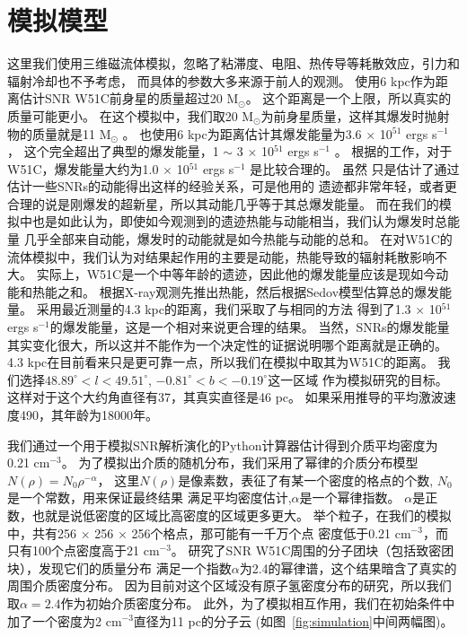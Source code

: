 \section{模拟模型}
\label{W51Cmod}
这里我们使用三维磁流体模拟，忽略了粘滞度、电阻、热传导等耗散效应，引力和辐射冷却也不予考虑，
而具体的参数大多来源于前人的观测。
\citet{Sasaki2014}使用6 kpc作为距离估计SNR W51C前身星的质量超过20 M$_\odot$。
这个距离是一个上限，所以真实的质量可能更小。
在这个模拟中，我们取20 M$_\odot$为前身星质量，这样其爆发时抛射物的质量就是11 M$_\odot$
\citep{Sukhbold2016}。
\citet{Koo1995}也使用6 kpc为距离估计其爆发能量为3.6 $\times$ 10$^{51}$ ergs s$^{-1}$，
这个完全超出了典型的爆发能量，1 $\sim$ 3 $\times$ 10$^{51}$ ergs s$^{-1}$ \citep{Poznanski2013}。
根据\citet{Poznanski2013}的工作，对于W51C，爆发能量大约为1.0 $\times$ 10$^{51}$ ergs s$^{-1}$
是比较合理的。
虽然 \citet{Poznanski2013}只是估计了通过估计一些SNRs的动能得出这样的经验关系，可是他用的
遗迹都非常年轻，或者更合理的说是刚爆发的超新星，所以其动能几乎等于其总爆发能量。
而在我们的模拟中也是如此认为，即使如今观测到的遗迹热能与动能相当，我们认为爆发时总能量
几乎全部来自动能，爆发时的动能就是如今热能与动能的总和。
在对W51C的流体模拟中，我们认为对结果起作用的主要是动能，热能导致的辐射耗散影响不大。
实际上，W51C是一个中等年龄的遗迹，因此他的爆发能量应该是现如今动能和热能之和。
\citet{Koo1995}根据X-ray观测先推出热能，然后根据Sedov模型估算总的爆发能量\citep{1959sdmm.book.....S}。
采用最近测量的4.3 kpc的距离\citep{Tian2013}，我们采取了与\citet{Koo1995}相同的方法
得到了1.3 $\times$ 10$^{51}$ ergs s$^{-1}$的爆发能量，这是一个相对来说更合理的结果。
当然，SNRs的爆发能量其实变化很大，所以这并不能作为一个决定性的证据说明哪个距离就是正确的。
4.3 kpc在目前看来只是更可靠一点，所以我们在模拟中取其为W51C的距离。
我们选择$48.89^{\circ}<l<49.51^{\circ}$, $-0.81^{\circ}<b<-0.19^{\circ}$这一区域
作为模拟研究的目标。
这样对于这个大约角直径有37，其真实直径是46 pc。
如果采用\citet{Koo1995}推导的平均激波速度490\kms，其年龄为18000年。

我们通过一个用于模拟SNR解析演化的Python计算器\citep{Leahy2017a}估计得到介质平均密度为
0.21 cm$^{-3}$。
为了模拟出介质的随机分布，我们采用了幂律的介质分布模型$N(\rho) = N_0 \rho^{-\alpha}$，
这里$N(\rho)$是像素数，表征了有某一个密度的格点的个数, $N_0$是一个常数，用来保证最终结果
满足平均密度估计,$\alpha$是一个幂律指数。
$\alpha$是正数，也就是说低密度的区域比高密度的区域更多更大。
举个粒子，在我们的模拟中，共有256 $\times$ 256 $\times$ 256个格点，那可能有一千万个点
密度低于0.21 cm$^{-3}$，而只有100个点密度高于21 cm$^{-3}$。
\citet{Parsons2012} 研究了SNR W51C周围的分子团块（包括致密团块），发现它们的质量分布
满足一个指数$\alpha$为2.4的幂律谱，这个结果暗含了真实的周围介质密度分布。
因为目前对这个区域没有原子氢密度分布的研究，所以我们取$\alpha=2.4$作为初始介质密度分布。
此外，为了模拟相互作用，我们在初始条件中加了一个密度为2 cm$^{-3}$直径为11 pc的分子云
(如图~\ref{fig:simulation}中间两幅图)。

